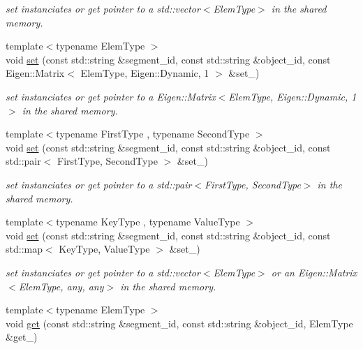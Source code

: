 \begin{DoxyCompactItemize}
\begin{DoxyCompactList}\small\item\em set instanciates or get pointer to a std\+::vector$<$\+Elem\+Type$>$ in the shared memory. \end{DoxyCompactList}\item 
{\footnotesize template$<$typename Elem\+Type $>$ }\\void \hyperlink{namespaceshared__memory_ac8364e5cde6c8a2f1abc2a59035f26a6}{set} (const std\+::string \&segment\+\_\+id, const std\+::string \&object\+\_\+id, const Eigen\+::\+Matrix$<$ Elem\+Type, Eigen\+::\+Dynamic, 1 $>$ \&set\+\_\+)
\begin{DoxyCompactList}\small\item\em set instanciates or get pointer to a Eigen\+::\+Matrix$<$\+Elem\+Type, Eigen\+::\+Dynamic, 1$>$ in the shared memory. \end{DoxyCompactList}\item 
{\footnotesize template$<$typename First\+Type , typename Second\+Type $>$ }\\void \hyperlink{namespaceshared__memory_a657bb799483a19a96f61706b50aca1e7}{set} (const std\+::string \&segment\+\_\+id, const std\+::string \&object\+\_\+id, const std\+::pair$<$ First\+Type, Second\+Type $>$ \&set\+\_\+)
\begin{DoxyCompactList}\small\item\em set instanciates or get pointer to a std\+::pair$<$\+First\+Type, Second\+Type$>$ in the shared memory. \end{DoxyCompactList}\item 
{\footnotesize template$<$typename Key\+Type , typename Value\+Type $>$ }\\void \hyperlink{namespaceshared__memory_a562e79433e54463f39c9c276b8440f4b}{set} (const std\+::string \&segment\+\_\+id, const std\+::string \&object\+\_\+id, const std\+::map$<$ Key\+Type, Value\+Type $>$ \&set\+\_\+)
\begin{DoxyCompactList}\small\item\em set instanciates or get pointer to a std\+::vector$<$\+Elem\+Type$>$ or an Eigen\+::\+Matrix$<$\+Elem\+Type, any, any$>$ in the shared memory. \end{DoxyCompactList}\item 
{\footnotesize template$<$typename Elem\+Type $>$ }\\void \hyperlink{namespaceshared__memory_ad017562102dbe044db2de6c79c0669d3}{get} (const std\+::string \&segment\+\_\+id, const std\+::string \&object\+\_\+id, Elem\+Type \&get\+\_\+)

\end{DoxyCompactItemize}
